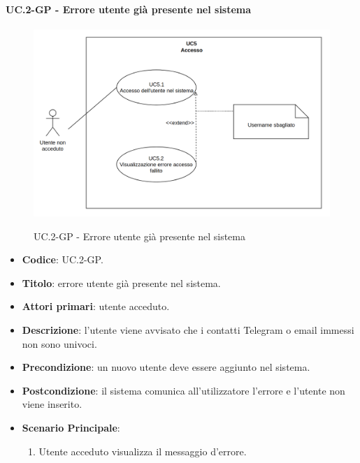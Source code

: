 			\paragraph{UC\theuccount.2-GP - Errore utente già presente nel sistema}
				\begin{figure}[H]
					\centering
					\includegraphics[width=\columnwidth]{img/UC5.png}\\
					\caption{UC\theuccount.2-GP - Errore utente già presente nel sistema}
				\end{figure}
				\begin{itemize}
					\item \textbf{Codice}: UC\theuccount.2-GP.
					\item \textbf{Titolo}: errore utente già presente nel sistema.
					\item \textbf{Attori primari}: utente acceduto.
					\item \textbf{Descrizione}: l’utente viene avvisato che i contatti Telegram o email immessi non sono univoci.
					\item \textbf{Precondizione}: un nuovo utente deve essere aggiunto nel sistema.
					\item \textbf{Postcondizione}: il sistema comunica all’utilizzatore l’errore e l'utente non viene inserito.
					\item \textbf{Scenario Principale}:
					\begin{enumerate}
						\item Utente acceduto visualizza il messaggio d'errore.
					\end{enumerate}
				\end{itemize}